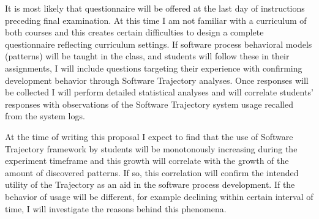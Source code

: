 It is most likely that questionnaire will be offered at the last day of instructions preceding final examination. At this time I am not familiar with a curriculum of both courses and this creates certain difficulties to design a complete questionnaire reflecting curriculum settings. If software process behavioral models (patterns) will be taught in the class, and students will follow these in their assignments, I will include questions targeting their experience with confirming development behavior through Software Trajectory analyses. Once responses will be collected I will perform detailed statistical analyses and will correlate students' responses with observations of the Software Trajectory system usage recalled from the system logs. 

At the time of writing this proposal I expect to find that the use of Software Trajectory framework by students will be monotonously increasing during the experiment timeframe and this growth will correlate with the growth of the amount of discovered patterns. If so, this correlation will confirm the intended utility of the Trajectory as an aid in the software process development. If the behavior of usage will be different, for example declining within certain interval of time, I will investigate the reasons behind this phenomena.
